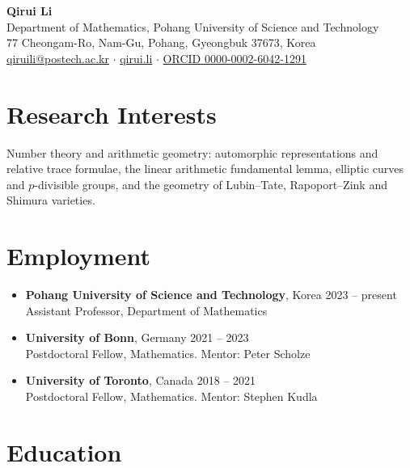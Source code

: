 \documentclass[a4paper,11pt]{article}
\newcommand{\dates}[1]{\hfill{\small #1}}
\begin{document}
\begin{center}
  {\LARGE\bfseries Qirui Li}\\[.5em]
  Department of Mathematics, Pohang University of Science and Technology\\
  77 Cheongam-Ro, Nam-Gu, Pohang, Gyeongbuk 37673, Korea\\[.3em]
  \href{mailto:qiruili@postech.ac.kr}{qiruili@postech.ac.kr}
  \quad$\cdot$\quad
  \href{http://qirui.li}{qirui.li}
  \quad$\cdot$\quad
  \href{https://orcid.org/0000-0002-6042-1291}{ORCID 0000-0002-6042-1291}
\end{center}

\section{Research Interests}

Number theory and arithmetic geometry: automorphic representations and
relative trace formulae, the linear arithmetic fundamental lemma, elliptic
curves and $p$-divisible groups, and the geometry of Lubin--Tate,
Rapoport--Zink and Shimura varieties.

\section{Employment}

\begin{itemize}[label={}]
  \item \textbf{Pohang University of Science and Technology}, Korea \dates{2023 -- present}\\
        Assistant Professor, Department of Mathematics
  \item \textbf{University of Bonn}, Germany \dates{2021 -- 2023}\\
        Postdoctoral Fellow, Mathematics. Mentor: Peter Scholze
  \item \textbf{University of Toronto}, Canada \dates{2018 -- 2021}\\
        Postdoctoral Fellow, Mathematics. Mentor: Stephen Kudla
\end{itemize}

\section{Education}
\end{document}
